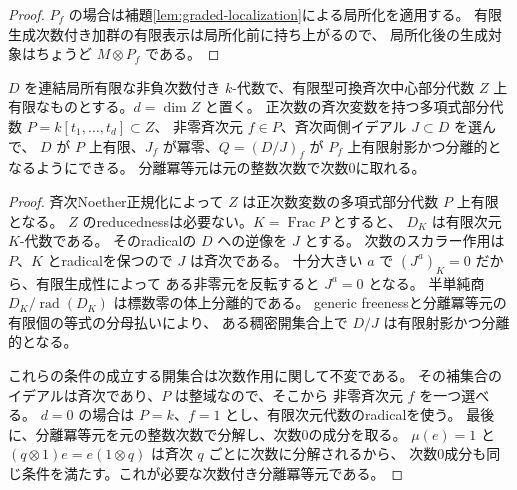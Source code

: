 \begin{proof}
 \(P_f\) の場合は補題\ref{lem:graded-localization}による局所化を適用する。
 有限生成次数付き加群の有限表示は局所化前に持ち上がるので、
 局所化後の生成対象はちょうど \(M\otimes P_f\) である。
\end{proof}

\begin{lemma}[多項式中心上の分離的な稠密開集合]\label{lem:polynomial-separable}
 \(D\) を連結局所有限な非負次数付き \(k\)-代数で、有限型可換斉次中心部分代数
 \(Z\) 上有限なものとする。\(d=\dim Z\) と置く。
 正次数の斉次変数を持つ多項式部分代数 \(P=k[t_1,\ldots,t_d]\subset Z\)、
 非零斉次元 \(f\in P\)、斉次両側イデアル \(J\subset D\) を選んで、
 \(D\) が \(P\) 上有限、\(J_f\) が冪零、\(Q=(D/J)_f\) が
 \(P_f\) 上有限射影かつ分離的となるようにできる。
 分離冪等元は元の整数次数で次数0に取れる。
\end{lemma}
\begin{proof}
 斉次Noether正規化によって \(Z\) は正次数変数の多項式部分代数 \(P\) 上有限となる。
 \(Z\) のreducednessは必要ない。\(K=\operatorname{Frac}P\) とすると、
 \(D_K\) は有限次元 \(K\)-代数である。
 そのradicalの \(D\) への逆像を \(J\) とする。
 次数のスカラー作用は \(P\)、\(K\) とradicalを保つので \(J\) は斉次である。
 十分大きい \(a\) で \((J^a)_K=0\) だから、有限生成性によって
 ある非零元を反転すると \(J^a=0\) となる。
 半単純商 \(D_K/\operatorname{rad}(D_K)\) は標数零の体上分離的である。
 generic freenessと分離冪等元の有限個の等式の分母払いにより、
 ある稠密開集合上で \(D/J\) は有限射影かつ分離的となる。

 これらの条件の成立する開集合は次数作用に関して不変である。
 その補集合のイデアルは斉次であり、\(P\) は整域なので、そこから
 非零斉次元 \(f\) を一つ選べる。
 \(d=0\) の場合は \(P=k\)、\(f=1\) とし、有限次元代数のradicalを使う。
 最後に、分離冪等元を元の整数次数で分解し、次数0の成分を取る。
 \(\mu(e)=1\) と \((q\otimes1)e=e(1\otimes q)\) は斉次 \(q\) ごとに次数に分解されるから、
 次数0成分も同じ条件を満たす。これが必要な次数付き分離冪等元である。
\end{proof}

